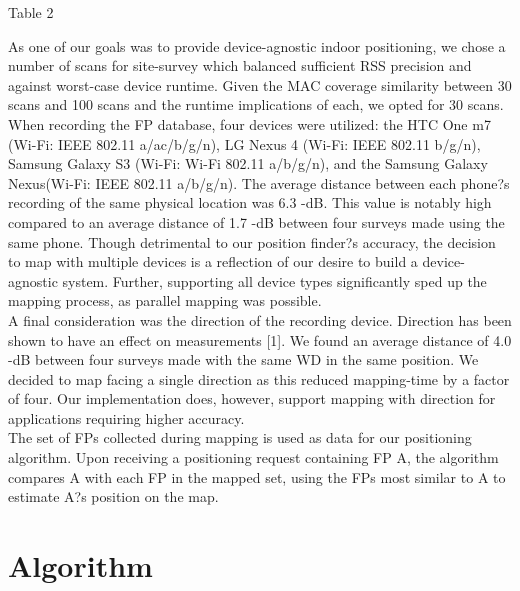 \documentclass[twoside]{article}
\begin{document}
\begin{multicols}{2}
\vspace{5mm}
\begin{center}
Table 2
\end{center}
	
\indent As one of our goals was to provide device-agnostic indoor positioning, we chose a number of scans for site-survey which balanced sufficient RSS precision and against worst-case device runtime. Given the MAC coverage similarity between 30 scans and 100 scans and the runtime implications of each, we opted for 30 scans. \\
\indent When recording the FP database, four devices were utilized: the HTC One m7 (Wi-Fi: IEEE 802.11 a/ac/b/g/n), LG Nexus 4  (Wi-Fi: IEEE 802.11 b/g/n), Samsung Galaxy S3 (Wi-Fi: Wi-Fi 802.11 a/b/g/n), and the Samsung Galaxy Nexus(Wi-Fi: IEEE 802.11 a/b/g/n). The average distance between each phone?s recording of the same physical location was 6.3 -dB. This value is notably high compared to an average distance of 1.7 -dB between four surveys made using the same phone. Though detrimental to our position finder?s accuracy, the decision to map with multiple devices is a reflection of our desire to build a device-agnostic system. Further, supporting all device types significantly sped up the mapping process, as parallel mapping was possible.\\
\indent A final consideration was the direction of the recording device. Direction has been shown to have an effect on measurements [1]. We found an average distance of 4.0 -dB between four surveys made with the same WD in the same position. We decided to map facing a single direction as this reduced mapping-time by a factor of four. Our implementation does, however, support mapping with direction for applications requiring higher accuracy.\\
\indent The set of FPs collected during mapping is used as data for our positioning algorithm. Upon receiving a positioning request containing FP A, the algorithm compares A with each FP in the mapped set, using the FPs most similar to A to estimate A?s position on the map.


\section{Algorithm}


\end{multicols}
\end{document}
